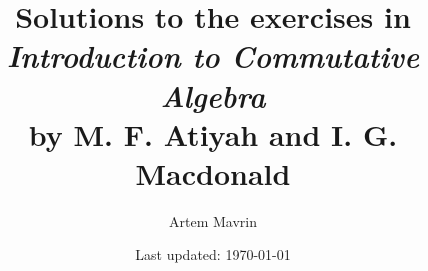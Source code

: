 \usepackage{atiyah-macdonald/packages/exercise}

\title{Solutions to the exercises in\\
\emph{Introduction to Commutative Algebra}\\
by M. F. Atiyah and I. G. Macdonald}
\author{Artem Mavrin}
\date{Last updated: \today}



\frontmatter
\maketitle
\tableofcontents
\mainmatter











\nocite{*}


